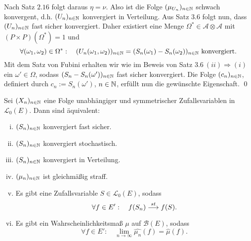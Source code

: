 \begin{proof*}
$$    $$
    Nach Satz $2.16$ folgt daraus $\eta = \nu$. Also ist die Folge $(\mu_{U_n})_{n \in \mathbb{N}}$ schwach konvergent, d.h. $(U_n)_{n \in \mathbb{N}}$ konvergiert in Verteilung. 
    Aus Satz $3.6$ folgt nun, dass $(U_n)_{n \in \mathbb{N}}$ fast sicher konvergiert. 
    Daher existiert eine Menge $\Omega^* \in \mathcal{A} \otimes \mathcal{A}$ mit $(P\times P)(\Omega^*) = 1$ und 
    $$
        \forall (\omega_1, \omega_2) \in \Omega^*: \quad (U_n(\omega_1, \omega_2))_{n \in \mathbb{N}} = (S_n(\omega_1) - S_n(\omega_2))_{n \in \mathbb{N}} \text{ konvergiert.}
    $$
    Mit dem Satz von Fubini erhalten wir wie im Beweis von Satz $3.6 \ (ii) \Rightarrow (i)$ ein $\omega' \in \Omega$, sodass \mbox{$(S_n - S_n(\omega'))_{n \in \mathbb{N}}$} fast sicher konvergiert. 
    Die Folge $(c_n)_{n \in \mathbb{N}}$, definiert durch $c_n := S_n(\omega')$, $n \in \mathbb{N}$, erfüllt nun die gewünschte Eigenschaft. \qed

\end{proof*}

\begin{theorem}
    Sei $(X_n)_{n \in \mathbb{N}}$ eine Folge unabhängiger und symmetrischer Zufallsvariablen in $\mathcal{L}_0(E)$. Dann sind äquivalent:
    \begin{enumerate}[(i)]
        \item $(S_n)_{n \in \mathbb{N}}$ konvergiert fast sicher.
        \item $(S_n)_{n \in \mathbb{N}}$ konvergiert stochastisch. 
        \item $(S_n)_{n \in \mathbb{N}}$ konvergiert in Verteilung. 
        \item $(\mu_n)_{n \in \mathbb{N}}$ ist gleichmäßig straff.
        \item Es gibt eine Zufallsvariable $S \in \mathcal{L}_0(E)$, sodass 
        $$
            \forall f \in E': \quad f(S_n) \overset{st}{\longrightarrow} f(S).
        $$
        \item Es gibt ein Wahrscheinlichkeitsmaß $\mu$ auf $\mathcal{B}(E)$, sodass 
        $$
            \forall f \in E': \quad \lim_{n \to \infty}\widehat{\mu_n}(f) = \widehat{\mu}(f). 
        $$
    \end{enumerate}
\end{theorem}


